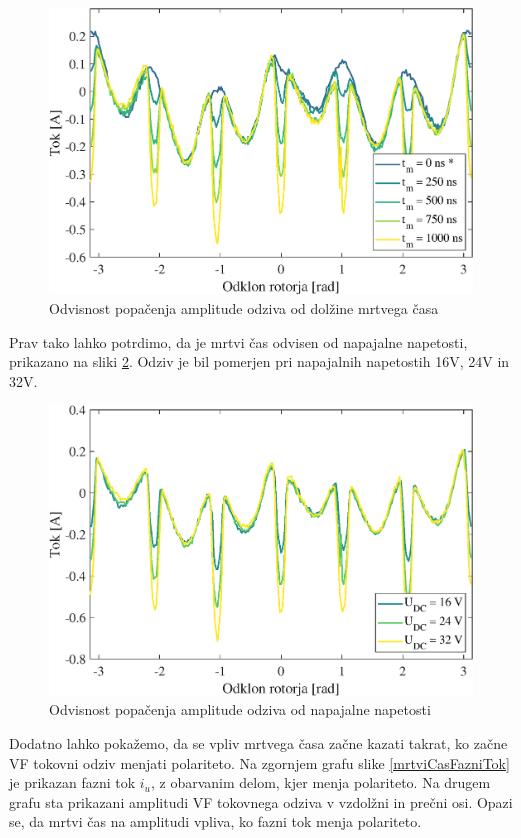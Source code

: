 \documentclass[a4paper,twoside,openright,12pt,slovene]{book}
\begin{document}
\begin{figure}[!htbp]
    \centering
    \includegraphics[width=0.8\columnwidth]{Slike/mrtviCas.eps}
    \caption{\label{mrtviCas} Odvisnost popačenja amplitude odziva od dolžine mrtvega časa }
\end{figure}

Prav tako lahko potrdimo, da je mrtvi čas odvisen od napajalne napetosti, prikazano na sliki \ref{mrtviCasNapetost}. Odziv je bil pomerjen pri napajalnih napetostih 16V, 24V in 32V.
\renewcommand*{\thefootnote}{\fnsymbol{footnote}}
\begin{figure}[!htbp]
    \centering
    \includegraphics[width=0.8\columnwidth]{Slike/mrtviCasNapetost.eps}
    \caption{\label{mrtviCasNapetost} Odvisnost popačenja amplitude odziva od napajalne napetosti }
\end{figure}


\newpage
Dodatno lahko pokažemo, da se vpliv mrtvega časa začne kazati takrat, ko začne VF tokovni odziv menjati polariteto. Na zgornjem grafu slike \ref{mrtviCasFazniTok} je prikazan fazni tok $i_u$, z
obarvanim delom, kjer menja polariteto. Na drugem grafu sta prikazani amplitudi VF tokovnega odziva v vzdolžni in prečni osi. Opazi se, da mrtvi čas na amplitudi vpliva, ko fazni tok menja polariteto.
\end{document}
